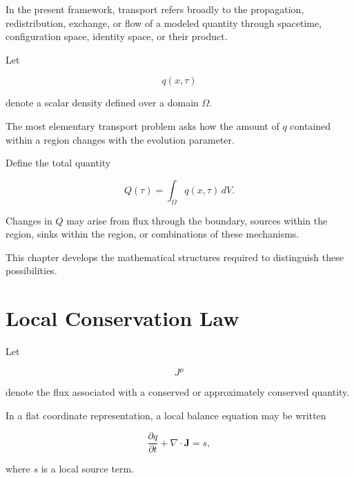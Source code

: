 \documentclass[12pt,oneside]{book}
\begin{document}
In the present framework, transport refers broadly to the
propagation, redistribution, exchange, or flow of a modeled
quantity through spacetime, configuration space, identity space,
or their product.

Let

\begin{equation}
    q(x,\tau)
\end{equation}

denote a scalar density defined over a domain
\(\Omega\).

The most elementary transport problem asks how the amount of
\(q\) contained within a region changes with the evolution
parameter.

Define the total quantity

\begin{equation}
    Q(\tau)
    =
    \int_{\Omega}
        q(x,\tau)
    \,dV.
    \label{eq:total-transported-quantity}
\end{equation}

Changes in \(Q\) may arise from flux through the boundary,
sources within the region, sinks within the region, or
combinations of these mechanisms.

This chapter develops the mathematical structures required to
distinguish these possibilities.


\section{Local Conservation Law}
\label{sec:local-conservation-law}

Let

\begin{equation}
    J^\mu
\end{equation}

denote the flux associated with a conserved or approximately
conserved quantity.

In a flat coordinate representation, a local balance equation
may be written

\begin{equation}
    \frac{\partial q}{\partial t}
    +
    \nabla\cdot\mathbf{J}
    =
    s,
    \label{eq:flat-continuity-source}
\end{equation}

where \(s\) is a local source term.
\end{document}
